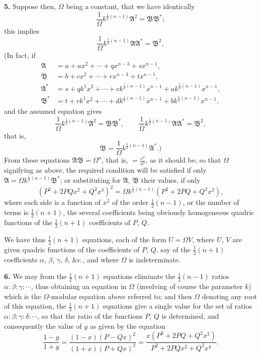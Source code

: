 \documentclass[11pt,a4paper]{article}
\theoremstyle{plain}
\begin{document}
\medskip
\noindent\textbf{5.} Suppose then, $\Omega$ being a constant, that we have identically
\[
\frac{1}{\Omega}k^{\frac{1}{2}(n - 1)}\mathfrak{A}^2 = \mathfrak{B}\mathfrak{B}^*;
\]
this implies
\[
\frac{1}{\Omega}k^{\frac{1}{2}(n - 1)}\mathfrak{A}\mathfrak{A}^* = \mathfrak{B}^2,
\]
(In fact, if
\begin{align*}
\mathfrak{A} &= a + ax^2 + \cdots + qx^{n-3} + sx^{n-1}, \\
\mathfrak{B} &= b + cx^2 + \cdots + rx^{n-3} + tx^{n-1}, \\
\mathfrak{A}^* &= s + qk^1x^2 + \cdots + ck^{\frac{1}{2}(n-1)}x^{n-1} + ak^{\frac{1}{2}(n-1)}x^{n-1}, \\
\mathfrak{B}^* &= t + rk^1x^2 + \cdots + dk^{\frac{1}{2}(n-1)}x^{n-1} + bk^{\frac{1}{2}(n-1)}x^{n-1},
\end{align*}
and the assumed equation gives
\[
\frac{1}{\Omega}k^{\frac{1}{2}(n-1)}\mathfrak{A}^2 = \mathfrak{B}\mathfrak{B}^*, \qquad
\frac{1}{\Omega}k^{\frac{1}{2}(n-1)}\mathfrak{A}\mathfrak{A}^* = \mathfrak{B}^2,
\]
that is,
\[
\mathfrak{B} = \frac{1}{\Omega}k^{\frac{1}{2}(n-1)}\mathfrak{A}^*.)
\]
From these equations $\mathfrak{A}\mathfrak{B} = \Omega^n$, that is, $= \frac{v^2}{u^2}$, as it should be; so that $\Omega$ signifying as above, the required condition will be satisfied if only $\mathfrak{A} = \Omega k^{\frac{1}{2}(n-1)}\mathfrak{B}^*$; or substituting for $\mathfrak{A}$, $\mathfrak{B}$ their values, if only
\[
(P^2 + 2PQx^2 + Q^2x^4)^2 = \Omega k^{\frac{1}{2}(n-1)}(P^2 + 2PQ + Q^2x^2),
\]
where each side is a function of $x^2$ of the order $\frac{1}{2}(n - 1)$, or the number of terms is $\frac{1}{2}(n + 1)$, the several coefficients being obviously homogeneous quadric functions of the $\frac{1}{2}(n + 1)$ coefficients of $P$, $Q$.

We have thus $\frac{1}{2}(n + 1)$ equations, each of the form $U = \Omega V$, where $U$, $V$ are given quadric functions of the coefficients of $P$, $Q$, say of the $\frac{1}{2}(n + 1)$ coefficients $\alpha$, $\beta$, $\gamma$, $\delta$, \&c., and where $\Omega$ is indeterminate.

\medskip
\noindent\textbf{6.} We may from the $\frac{1}{2}(n + 1)$ equations eliminate the $\frac{1}{2}(n - 1)$ ratios $\alpha : \beta : \gamma : \cdots$, thus obtaining an equation in $\Omega$ (involving of course the parameter $k$) which is the $\Omega$-modular equation above referred to; and then $\Omega$ denoting any root of this equation, the $\frac{1}{2}(n + 1)$ equations give a single value for the set of ratios $\alpha : \beta : \gamma : \delta : \cdots$, so that the ratio of the functions $P$, $Q$ is determined, and consequently the value of $y$ as given by the equation
\[
\frac{1 - y}{1 + y} = \frac{(1 - x)(P - Qx)^2}{(1 + x)(P + Qx)^2} = \frac{x(P^2 + 2PQ + Q^2x^2)}{P^2 + 2PQx^2 + Q^2x^4}.
\]
\end{document}
